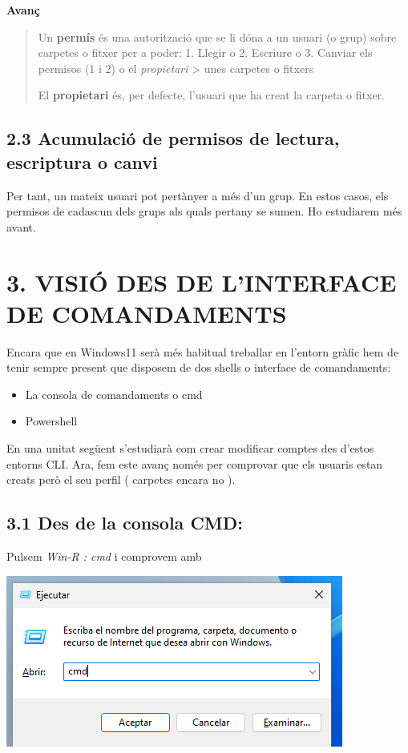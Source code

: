\documentclass[
  a4paper,
]{article}
\providecommand{\tightlist}{%
  \setlength{\itemsep}{0pt}\setlength{\parskip}{0pt}}
\begin{document}
\textbf{Avanç}

\begin{quote}
Un \textbf{permís} és una autorització que se li dóna a un usuari (o
grup) sobre carpetes o fitxer per a poder: 1. Llegir o 2. Escriure o 3.
Canviar els permisos (1 i 2) o el \emph{propietari} \textgreater{} unes
carpetes o fitxers

El \textbf{propietari} és, per defecte, l'usuari que ha creat la carpeta
o fitxer.
\end{quote}

\subsection{2.3 Acumulació de permisos de lectura, escriptura o
canvi}\label{acumulaciuxf3-de-permisos-de-lectura-escriptura-o-canvi}

Per tant, un mateix usuari pot pertànyer a més d'un grup. En estos
casos, els permisos de cadascun dels grups als quals pertany se sumen.
Ho estudiarem més avant.

\section{3. VISIÓ DES DE L'INTERFACE DE
COMANDAMENTS}\label{visiuxf3-des-de-linterface-de-comandaments}

Encara que en Windows11 serà més habitual treballar en l'entorn gràfic
hem de tenir sempre present que disposem de dos shells o interface de
comandaments:

\begin{itemize}
\tightlist
\item
  La consola de comandaments o cmd
\item
  Powershell
\end{itemize}

En una unitat següent s'estudiarà com crear modificar comptes des
d'estos entorns CLI. Ara, fem este avanç només per comprovar que els
usuaris estan creats però el seu perfil ( carpetes encara no ).

\subsection{3.1 Des de la consola CMD:}\label{des-de-la-consola-cmd}

Pulsem \emph{Win-R : cmd} i comprovem amb

\includegraphics{png/WinRcmd.png}
\end{document}
